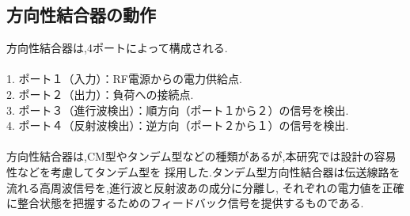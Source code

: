 \documentclass[uplatex, 12pt]{ujbook}
\begin{document}
 \subsection{方向性結合器の動作}
 方向性結合器は,4ポートによって構成される.\\\\
 1. ポート１（入力）：RF電源からの電力供給点.\\
 2. ポート２（出力）：負荷への接続点.\\
 3. ポート３（進行波検出）：順方向（ポート１から２）の信号を検出.\\
 4. ポート４（反射波検出）：逆方向（ポート２から１）の信号を検出.\\\\
 方向性結合器は,CM型やタンデム型などの種類があるが,本研究では設計の容易性などを考慮してタンデム型を
 採用した.タンデム型方向性結合器は伝送線路を流れる高周波信号を,進行波と反射波あの成分に分離し,
それぞれの電力値を正確に整合状態を把握するためのフィードバック信号を提供するものである.\\
\end{document}
